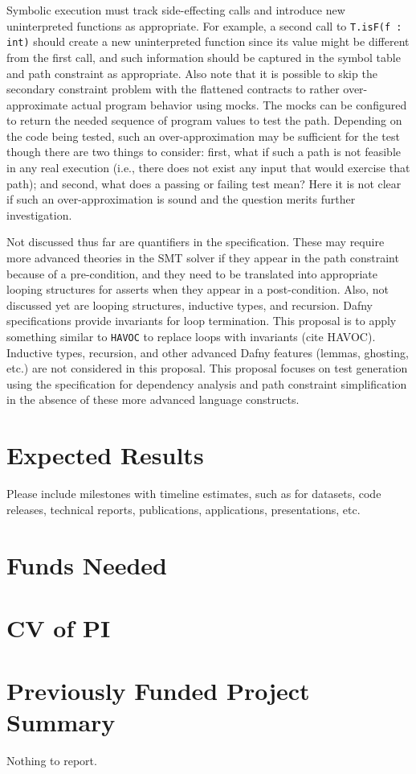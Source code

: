 \documentclass[11pt,onecolumn,notitlepage]{article}
\begin{document}
Symbolic execution must track side-effecting calls and introduce new uninterpreted functions as appropriate. For example, a second call to \texttt{T.isF(f : int)} should create a new uninterpreted function since its value might be different from the first call, and such information should be captured in the symbol table and path constraint as appropriate. Also note that it is possible to skip the secondary constraint problem with the flattened contracts to rather over-approximate actual program behavior using mocks. The mocks can be configured to return the needed sequence of program values to test the path. Depending on the code being tested, such an over-approximation may be sufficient for the test though there are two things to consider: first, what if such a path is not feasible in any real execution (i.e., there does not exist any input that would exercise that path); and second, what does a passing or failing test mean? Here it is not clear if such an over-approximation is sound and the question merits further investigation.

Not discussed thus far are quantifiers in the specification. These may require more advanced theories in the SMT solver if they appear in the path constraint because of a pre-condition, and they need to be translated into appropriate looping structures for asserts when they appear in a post-condition.  Also, not discussed yet are looping structures, inductive types, and recursion. Dafny specifications provide invariants for loop termination. This proposal is to apply something similar to \texttt{HAVOC} to replace loops with invariants (cite HAVOC). Inductive types, recursion, and other advanced Dafny features (lemmas, ghosting, etc.) are not considered in this proposal. This proposal focuses on test generation using the specification for dependency analysis and path constraint simplification in the absence of these more advanced language constructs.

\section*{Expected Results}
Please include milestones with timeline estimates, such as for datasets, code releases, technical reports, publications, applications, presentations, etc. 

\section*{Funds Needed}

\appendix
\appendixpage




\section{CV of PI}

\section{Previously Funded Project Summary}
Nothing to report.
\end{document}
